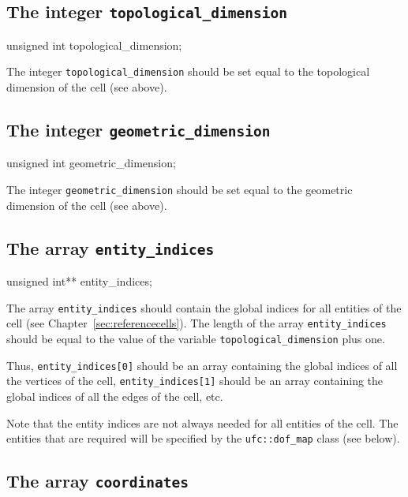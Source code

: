 \subsection{The integer \texttt{topological\_dimension}}

\begin{code}
unsigned int topological_dimension;
\end{code}

The integer \texttt{topological\_dimension} should be set equal to the
topological dimension of the cell (see above).

\subsection{The integer \texttt{geometric\_dimension}}

\begin{code}
unsigned int geometric_dimension;
\end{code}

The integer \texttt{geometric\_dimension} should be set equal to the
geometric dimension of the cell (see above).

\subsection{The array \texttt{entity\_indices}}

\begin{code}
unsigned int** entity_indices;
\end{code}

The array \texttt{entity\_indices} should contain the global indices
for all entities of the cell (see Chapter~\ref{sec:referencecells}).
The length of the array \texttt{entity\_indices} should be equal to
the value of the variable \texttt{topological\_dimension} plus one.

Thus, \texttt{entity\_indices[0]} should be an array containing the
global indices of all the vertices of the cell,
\texttt{entity\_indices[1]} should be an array containing the global
indices of all the edges of the cell, etc.

Note that the entity indices are not always needed for all entities of
the cell. The entities that are required will be specified by the
\texttt{ufc::dof\_map} class (see below).

\subsection{The array \texttt{coordinates}}

